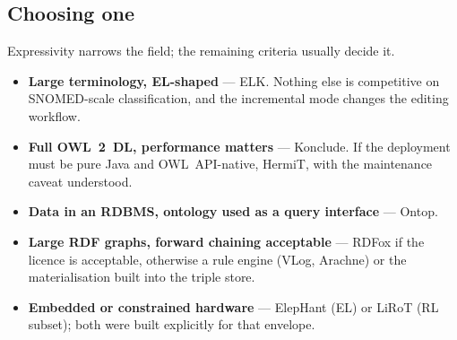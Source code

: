 \documentclass[11pt,a4paper]{article}
\begin{document}
\subsection*{Choosing one}

Expressivity narrows the field; the remaining criteria usually decide it.
\begin{itemize}
  \item \textbf{Large terminology, EL-shaped} --- ELK. Nothing else is
    competitive on SNOMED-scale classification, and the incremental mode
    changes the editing workflow.
  \item \textbf{Full OWL~2~DL, performance matters} --- Konclude. If the
    deployment must be pure Java and OWL~API-native, HermiT, with the
    maintenance caveat understood.
  \item \textbf{Data in an RDBMS, ontology used as a query interface} ---
    Ontop.
  \item \textbf{Large RDF graphs, forward chaining acceptable} --- RDFox if the
    licence is acceptable, otherwise a rule engine (VLog, Arachne) or the
    materialisation built into the triple store.
  \item \textbf{Embedded or constrained hardware} --- ElepHant (EL) or LiRoT
    (RL subset); both were built explicitly for that envelope.
\end{itemize}
\end{document}

